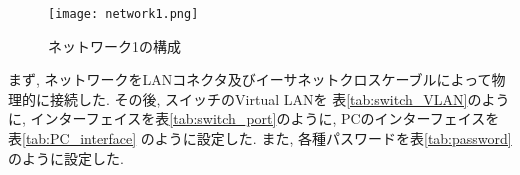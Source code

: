 \documentclass{jsarticle}
\begin{document}
\begin{figure}[htb]%
\begin{center}
\setlength{\unitlength}{1mm}
\texttt{[image: network1.png]}
\end{center}

\caption{ネットワーク1の構成}
\label{fig:network1}
\end{figure}

まず, ネットワークをLANコネクタ及びイーサネットクロスケーブルによって物理的に接続した. その後, スイッチのVirtual LANを
表\ref{tab:switch_VLAN}のように, インターフェイスを表\ref{tab:switch_port}のように, PCのインターフェイスを表\ref{tab:PC_interface}
のように設定した. また, 各種パスワードを表\ref{tab:password}のように設定した. 
\end{document}
